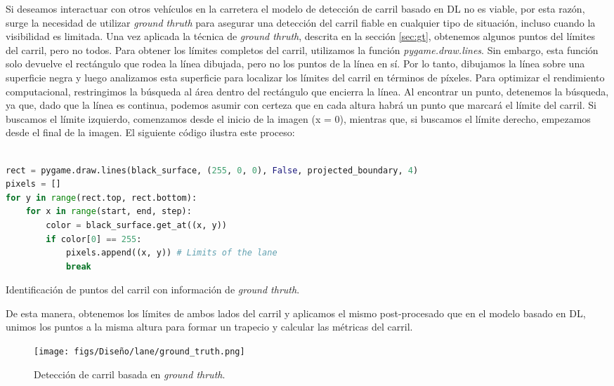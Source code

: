 Si deseamos interactuar con otros vehículos en la carretera el modelo de detección de carril basado en \ac{DL} no es viable, por esta razón, surge la necesidad de utilizar \textit{ground thruth} para asegurar una detección del carril fiable en cualquier tipo de situación, incluso cuando la visibilidad es limitada. Una vez aplicada la técnica de \textit{ground thruth}, descrita en la sección \ref{sec:gt}, obtenemos algunos puntos del límites del carril, pero no todos. Para obtener los límites completos del carril, utilizamos la función \textit{pygame.draw.lines}. Sin embargo, esta función solo devuelve el rectángulo que rodea la línea dibujada, pero no los puntos de la línea en sí. Por lo tanto, dibujamos la línea sobre una superficie negra y luego analizamos esta superficie para localizar los límites del carril en términos de píxeles. Para optimizar el rendimiento computacional, restringimos la búsqueda al área dentro del rectángulo que encierra la línea. Al encontrar un punto, detenemos la búsqueda, ya que, dado que la línea es continua, podemos asumir con certeza que en cada altura habrá un punto que marcará el límite del carril. Si buscamos el límite izquierdo, comenzamos desde el inicio de la imagen (x = 0), mientras que, si buscamos el límite derecho, empezamos desde el final de la imagen. El siguiente código ilustra este proceso:

\begin{code}[h]
\begin{lstlisting}[language=Python]

rect = pygame.draw.lines(black_surface, (255, 0, 0), False, projected_boundary, 4)
pixels = []
for y in range(rect.top, rect.bottom):
    for x in range(start, end, step):
        color = black_surface.get_at((x, y))
        if color[0] == 255:
            pixels.append((x, y)) # Limits of the lane
            break
\end{lstlisting}
\caption[Identificación de puntos del carril con información de \textit{ground thruth}]{Identificación de puntos del carril con información de \textit{ground thruth}.}
\label{cod:gt_carril}
\end{code}

\newpage

De esta manera, obtenemos los límites de ambos lados del carril y aplicamos el mismo post-procesado que en el modelo basado en \ac{DL}, unimos los puntos a la misma altura para formar un trapecio y calcular las métricas del carril. 

\begin{figure}[ht]
\centering
\texttt{[image: figs/Diseño/lane/ground\_truth.png]}
\caption{Detección de carril basada en \textit{ground thruth}.}
\label{fig:gt_final_carril}
\end{figure}

